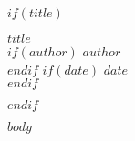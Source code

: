 \documentclass[11pt]{article}
\begin{document}
$if(title)$
\begin{center}
  {\LARGE \textbf{$title$}}\\[1em]
  $if(author)$ {\large $author$}\\[0.5em] $endif$
  $if(date)$ {\small $date$}\\[0.5em] $endif$
\end{center}
$endif$

$body$
\end{document}
